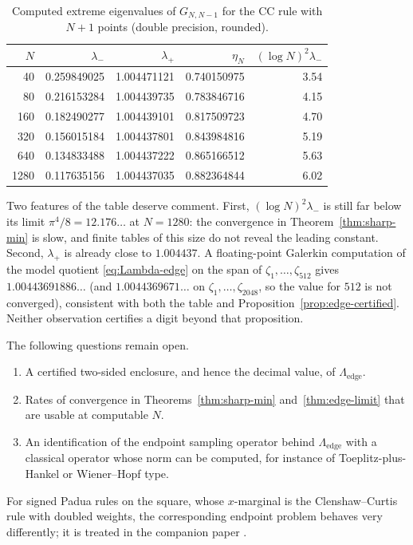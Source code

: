\documentclass{siamart251216}
\begin{document}
\begin{table}[htbp]
\centering
\caption{Computed extreme eigenvalues of $G_{N,N-1}$ for the CC rule with
$N+1$ points (double precision, rounded).}\label{tab:cc}
\begin{tabular}{rrrrr}\toprule
$N$ & $\lambda_-$ & $\lambda_+$ & $\eta_N$ & $(\log N)^2\lambda_-$\\\midrule
40   & 0.259849025 & 1.004471121 & 0.740150975 & 3.54\\
80   & 0.216153284 & 1.004439735 & 0.783846716 & 4.15\\
160  & 0.182490277 & 1.004439101 & 0.817509723 & 4.70\\
320  & 0.156015184 & 1.004437801 & 0.843984816 & 5.19\\
640  & 0.134833488 & 1.004437222 & 0.865166512 & 5.63\\
1280 & 0.117635156 & 1.004437035 & 0.882364844 & 6.02\\\bottomrule
\end{tabular}
\end{table}

Two features of the table deserve comment. First, $(\log N)^2\lambda_-$ is
still far below its limit $\pi^4/8=12.176\ldots$ at $N=1280$: the
convergence in Theorem~\ref{thm:sharp-min} is slow, and finite tables of
this size do not reveal the leading constant. Second, $\lambda_+$ is
already close to $1.004437$. A floating-point Galerkin computation of the
model quotient \eqref{eq:Lambda-edge} on the span of $\zeta_1,\dots,\zeta_{512}$
gives $1.00443691886\ldots$ (and $1.0044369671\ldots$ on
$\zeta_1,\dots,\zeta_{2048}$, so the value for $512$ is not converged),
consistent with both the table and
Proposition~\ref{prop:edge-certified}. Neither observation certifies a
digit beyond that proposition.

The following questions remain open.
\begin{enumerate}
\item A certified two-sided enclosure, and hence the decimal value, of
$\Lambda_{\mathrm{edge}}$.
\item Rates of convergence in Theorems~\ref{thm:sharp-min}
and~\ref{thm:edge-limit} that are usable at computable $N$.
\item An identification of the endpoint sampling operator behind
$\Lambda_{\mathrm{edge}}$ with a classical operator whose norm can be
computed, for instance of Toeplitz-plus-Hankel or Wiener--Hopf type.
\end{enumerate}
For signed Padua rules on the square, whose $x$-marginal is the
Clenshaw--Curtis rule with doubled weights, the corresponding endpoint
problem behaves very differently; it is treated in the companion paper \cite{MZ-SP}.
\end{document}
